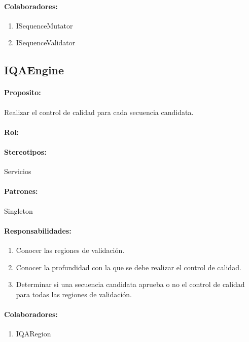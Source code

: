 \documentclass[a4paper,10pt]{article}
\begin{document}
    \paragraph{Colaboradores:}
      \begin{enumerate}
       \item ISequenceMutator
       \item ISequenceValidator
      \end{enumerate}

  \subsection{IQAEngine}
    \paragraph{Proposito:} Realizar el control de calidad para cada secuencia
candidata.
    \paragraph{Rol:}
    \paragraph{Stereotipos:} Servicios
    \paragraph{Patrones:} Singleton
    \paragraph{Responsabilidades:}
      \begin{enumerate}
       \item Conocer las regiones de validaci\'on.
       \item Conocer la profundidad con la que se debe realizar el control de
calidad.
       \item Determinar si una secuencia candidata aprueba o no el control de
calidad para todas las regiones de validaci\'on.
      \end{enumerate}
    \paragraph{Colaboradores:}
      \begin{enumerate}
       \item IQARegion
      \end{enumerate}
\end{document}
